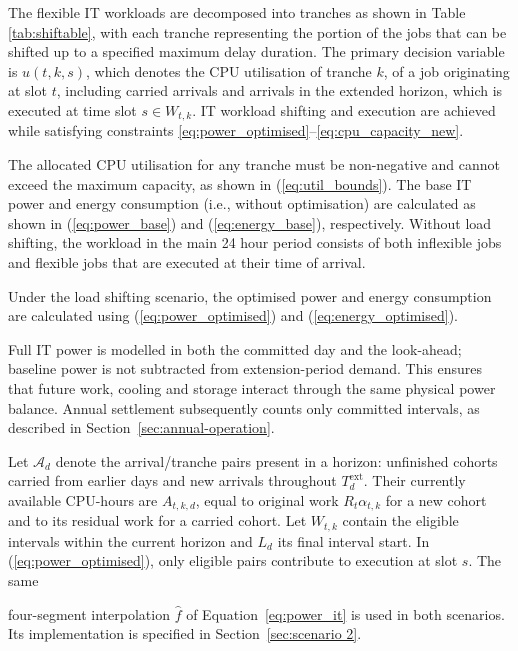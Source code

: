\documentclass[lettersize,journal]{IEEEtran}
\providecommand{\DIFadd}[1]{{\color{blue}#1}}
\providecommand{\DIFaddbegin}{}
\providecommand{\DIFaddend}{}
\begin{document}
The flexible IT workloads are decomposed into tranches as shown in Table \ref{tab:shiftable}, with each tranche representing the portion of the jobs that can be shifted up to a specified maximum delay duration. The primary decision variable is $u(t,k,s)$, which denotes the CPU utilisation of tranche $k$, of a job originating at slot  \DIFaddbegin \DIFadd{$t$, including carried arrivals and arrivals in the extended horizon, }\DIFaddend which is executed at time slot $s \in W_{t,k}$. IT workload shifting and execution  \DIFaddbegin \DIFadd{are }\DIFaddend achieved while satisfying constraints \eqref{eq:power_optimised}--\eqref{eq:cpu_capacity_new}.

The allocated CPU utilisation for any tranche must be non-negative and cannot exceed the maximum capacity, as shown in (\ref{eq:util_bounds}). The base IT power and energy consumption (i.e., without optimisation) are calculated as shown in (\ref{eq:power_base}) and (\ref{eq:energy_base}), respectively. Without load shifting, the workload in the main 24 hour period consists of both inflexible jobs and flexible jobs that are executed at their time of arrival.

Under the load shifting scenario, the optimised power and energy consumption are calculated using (\ref{eq:power_optimised}) and (\ref{eq:energy_optimised}).  \DIFaddbegin \DIFadd{Full IT power is modelled in both the committed day and the look-ahead; baseline power is not subtracted from extension-period demand. This ensures that future work, cooling and storage interact through the same physical power balance. Annual settlement subsequently counts only committed intervals, as described in Section~\ref{sec:annual-operation}.

}\DIFaddend 

\DIFaddbegin \DIFadd{Let $\mathcal A_d$ denote the arrival/tranche pairs present in a horizon: unfinished cohorts carried from earlier days and new arrivals throughout $T_d^{\mathrm{ext}}$. Their currently available CPU-hours are $A_{t,k,d}$, equal to original work $R_t\alpha_{t,k}$ for a new cohort and to its residual work for a carried cohort. Let $W_{t,k}$ contain the eligible intervals within the current horizon and $L_d$ its final interval start. }\DIFaddend In (\ref{eq:power_optimised}),  \DIFaddbegin \DIFadd{only eligible pairs contribute to execution at slot $s$}\DIFaddend . The same  \DIFaddbegin \DIFadd{four-segment interpolation $\widehat f$ of Equation~\eqref{eq:power_it} is used in both scenarios. Its implementation is specified in Section~\ref{sec:scenario 2}.

}\DIFaddend 
\end{document}
